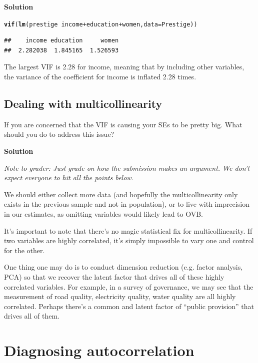 \documentclass{article}\usepackage[]{graphicx}\usepackage[]{color}
\makeatletter
\newcommand{\hlopt}[1]{\textcolor[rgb]{0,0,0}{#1}}%
\newcommand{\hlstd}[1]{\textcolor[rgb]{0.345,0.345,0.345}{#1}}%
\newcommand{\hlkwc}[1]{\textcolor[rgb]{0.333,0.667,0.333}{#1}}%
\newcommand{\hlkwd}[1]{\textcolor[rgb]{0.737,0.353,0.396}{\textbf{#1}}}%
\newenvironment{kframe}{%
 \def\at@end@of@kframe{}%
 \ifinner\ifhmode%
  \def\at@end@of@kframe{\end{minipage}}%
  \begin{minipage}{\columnwidth}%
 \fi\fi%
 \def\FrameCommand##1{\hskip\@totalleftmargin \hskip-\fboxsep
 \colorbox{shadecolor}{##1}\hskip-\fboxsep
     \hskip-\linewidth \hskip-\@totalleftmargin \hskip\columnwidth}%
 \MakeFramed {\advance\hsize-\width
   \@totalleftmargin\z@ \linewidth\hsize
   \@setminipage}}%
 {\par\unskip\endMakeFramed%
 \at@end@of@kframe}
\newenvironment{knitrout}{}{} %
\makeatother
\begin{document}
\textbf{Solution}

\begin{knitrout}
\color{fgcolor}\begin{kframe}
\begin{alltt}
\hlkwd{vif}\hlstd{(}\hlkwd{lm}\hlstd{(prestige} \hlopt{~} \hlstd{income} \hlopt{+} \hlstd{education} \hlopt{+} \hlstd{women,} \hlkwc{data}\hlstd{=Prestige))}
\end{alltt}
\begin{verbatim}
##    income education     women 
##  2.282038  1.845165  1.526593
\end{verbatim}
\end{kframe}
\end{knitrout}

The largest VIF is 2.28 for income, meaning that by including other variables, the variance of the coefficient for income is inflated 2.28 times.

\subsection{Dealing with multicollinearity}

If you are concerned that the VIF is causing your SEs to be pretty big. What should you do to address this issue?

\textbf{Solution}

\textit{Note to grader: Just grade on how the submission makes an argument. We don't expect everyone to hit all the points below.}

We should either collect more data (and hopefully the multicollinearity only exists in the previous sample and not in population), or to live with imprecision in our estimates, as omitting variables would likely lead to OVB.

It's important to note that there's no magic statistical fix for multicollinearity. If two variables are highly correlated, it's simply impossible to vary one and control for the other.

One thing one may do is to conduct dimension reduction (e.g. factor analysis, PCA) so that we recover the latent factor that drives all of these highly correlated variables. For example, in a survey of governance, we may see that the measurement of road quality, electricity quality, water quality are all highly correlated. Perhaps there's a common and latent factor of ``public provision'' that drives all of them.


\section{Diagnosing autocorrelation}
\end{document}
